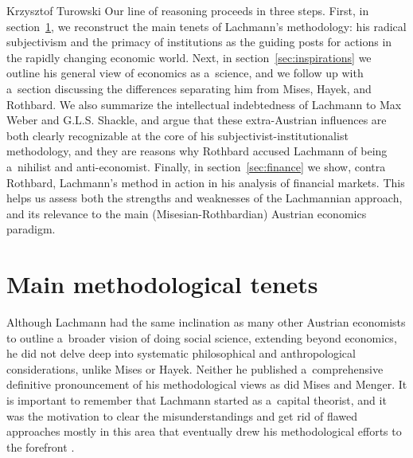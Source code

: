 \begin{artengenv}{Krzysztof Turowski}
Our line of reasoning proceeds in three steps.
First, in section~\ref{sec:tenets}, we reconstruct the main tenets of Lachmann's methodology: his radical subjectivism and the primacy of institutions as the guiding posts for actions in the rapidly changing economic world.
Next, in section~\ref{sec:inspirations} we outline his general view of economics as a~science, and we follow up with a~section discussing the differences separating him from Mises, Hayek, and Rothbard. We also summarize the intellectual indebtedness of Lachmann to Max Weber and G.L.S. Shackle, and argue that these extra-Austrian influences are both clearly recognizable at the core of his subjectivist-institutionalist methodology, and they are reasons why Rothbard accused Lachmann of being a~nihilist and anti-economist.
Finally, in section~\ref{sec:finance} we show, contra Rothbard, Lachmann's method in action in his analysis of financial markets. This helps us assess both the strengths and weaknesses of the Lachmannian approach, and its relevance to the main (Misesian-Rothbardian) Austrian economics paradigm.

\section{Main methodological tenets}
\label{sec:tenets}

Although Lachmann had the same inclination as many other Austrian economists to outline a~broader vision of doing social science, extending beyond economics, he did not delve deep into systematic philosophical and anthropological considerations, unlike Mises or Hayek. Neither he published a~comprehensive definitive pronouncement of his methodological views as did Mises and Menger.
It is important to remember that Lachmann started as a~capital theorist, and it was the motivation to clear the misunderstandings and get rid of flawed approaches mostly in this area that eventually drew his methodological efforts to the forefront \parencite[215]{prychitko-review}.


\end{artengenv}
